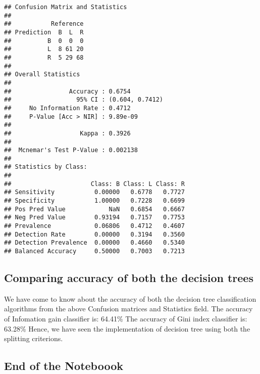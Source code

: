 \documentclass[
]{article}
\begin{document}
\begin{verbatim}
## Confusion Matrix and Statistics
## 
##           Reference
## Prediction  B  L  R
##          B  0  0  0
##          L  8 61 20
##          R  5 29 68
## 
## Overall Statistics
##                                          
##                Accuracy : 0.6754         
##                  95% CI : (0.604, 0.7412)
##     No Information Rate : 0.4712         
##     P-Value [Acc > NIR] : 9.89e-09       
##                                          
##                   Kappa : 0.3926         
##                                          
##  Mcnemar's Test P-Value : 0.002138       
## 
## Statistics by Class:
## 
##                      Class: B Class: L Class: R
## Sensitivity           0.00000   0.6778   0.7727
## Specificity           1.00000   0.7228   0.6699
## Pos Pred Value            NaN   0.6854   0.6667
## Neg Pred Value        0.93194   0.7157   0.7753
## Prevalence            0.06806   0.4712   0.4607
## Detection Rate        0.00000   0.3194   0.3560
## Detection Prevalence  0.00000   0.4660   0.5340
## Balanced Accuracy     0.50000   0.7003   0.7213
\end{verbatim}

\hypertarget{comparing-accuracy-of-both-the-decision-trees}{%
\subsection{\texorpdfstring{\textbf{Comparing accuracy of both the
decision
trees}}{Comparing accuracy of both the decision trees}}\label{comparing-accuracy-of-both-the-decision-trees}}

We have come to know about the accuracy of both the decision tree
classification algorithms from the above Confusion matrices and
Statistics field. The accuracy of Infomation gain classifier is: 64.41\%
The accuracy of Gini index classifier is: 63.28\% Hence, we have seen
the implementation of decision tree using both the splitting criterions.

\hypertarget{end-of-the-noteboook}{%
\subsection{\texorpdfstring{\textbf{End of the
Noteboook}}{End of the Noteboook}}\label{end-of-the-noteboook}}
\end{document}
